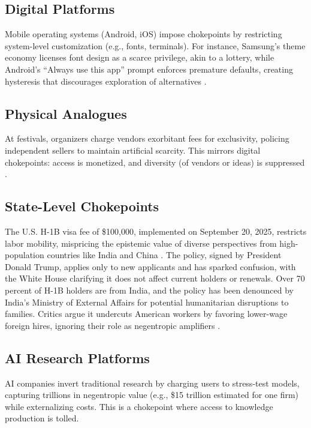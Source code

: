 \documentclass[12pt]{article}
\begin{document}
\subsection{Digital Platforms}
Mobile operating systems (Android, iOS) impose chokepoints by restricting system-level customization (e.g., fonts, terminals). For instance, Samsung’s theme economy licenses font design as a scarce privilege, akin to a lottery, while Android’s “Always use this app” prompt enforces premature defaults, creating hysteresis that discourages exploration of alternatives \citep{doctorow2020lockin}.

\subsection{Physical Analogues}
At festivals, organizers charge vendors exorbitant fees for exclusivity, policing independent sellers to maintain artificial scarcity. This mirrors digital chokepoints: access is monetized, and diversity (of vendors or ideas) is suppressed \citep{giblin2022chokepoint}.

\subsection{State-Level Chokepoints}
The U.S. H-1B visa fee of \$100,000, implemented on September 20, 2025, restricts labor mobility, mispricing the epistemic value of diverse perspectives from high-population countries like India and China \citep{cbc2025trumpvisa}. The policy, signed by President Donald Trump, applies only to new applicants and has sparked confusion, with the White House clarifying it does not affect current holders or renewals. Over 70 percent of H-1B holders are from India, and the policy has been denounced by India's Ministry of External Affairs for potential humanitarian disruptions to families. Critics argue it undercuts American workers by favoring lower-wage foreign hires, ignoring their role as negentropic amplifiers \citep{cbc2025trumpvisa}.

\subsection{AI Research Platforms}
AI companies invert traditional research by charging users to stress-test models, capturing trillions in negentropic value (e.g., \$15 trillion estimated for one firm) while externalizing costs. This is a chokepoint where access to knowledge production is tolled.
\end{document}
